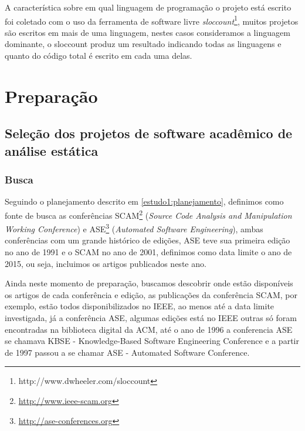 A característica sobre em qual linguagem de programação o projeto está escrito
foi coletado com o uso da ferramenta de software livre {\it
sloccount}\footnote{http://www.dwheeler.com/sloccount}, muitos projetos são
escritos em mais de uma linguagem, nestes casos consideramos a linguagem
dominante, o sloccount produz um resultado indicando todas as linguagens e
quanto do código total é escrito em cada uma delas.


\section{Preparação} \label{estudo1:preparacao}

\subsection{Seleção dos projetos de software acadêmico de análise estática} %

\subsubsection{Busca}


Seguindo o planejamento descrito em \ref{estudo1:planejamento}, definimos como
fonte de busca as conferências SCAM\footnote{\url{http://www.ieee-scam.org}}
({\it Source Code Analysis and Manipulation Working Conference}) e
ASE\footnote{\url{http://ase-conferences.org}} ({\it Automated Software
Engineering}), ambas conferências com um grande histórico de edições, ASE teve
sua primeira edição no ano de 1991 e o SCAM no ano de 2001, definimos como data
limite o ano de 2015, ou seja, incluimos os artigos publicados neste ano.

Ainda neste momento de preparação, buscamos descobrir onde estão disponíveis os
artigos de cada conferência e edição, as publicações da conferência SCAM, por
exemplo, estão todos disponibilizados no IEEE, ao menos até a data limite
investigada, já a conferência ASE, algumas edições está no IEEE outras só foram
encontradas na biblioteca digital da ACM, até o ano de 1996 a conferencia ASE
se chamava KBSE - Knowledge-Based Software Engineering Conference e a partir de
1997 passou a se chamar ASE - Automated Software Conference.

